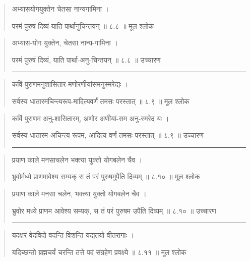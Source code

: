 \begin{quotation} 

अभ्यासयोगयुक्तेन चेतसा नान्यगामिना  ।  

परमं पुरुषं दिव्यं याति पार्थानुचिन्तयन्‌  ॥ ८.८ ॥  मूल श्लोक
\end{quotation}

\begin{quotation}

अभ्यास-योग युक्तेन, चेतसा नान्य-गामिना  ।  

परमं पुरुषं दिव्यं, याति पार्था-अनु-चिन्तयन्‌  ॥ ८.८ ॥  उच्चारण

\noindent\rule{16cm}{0.4pt} 
\end{quotation}


\begin{quotation} 

कविं पुराणमनुशासितार-मणोरणीयांसमनुस्मरेद्यः  ।  

सर्वस्य धातारमचिन्त्यरूप-मादित्यवर्णं तमसः परस्तात्‌  ॥ ८.९ ॥  मूल श्लोक
\end{quotation}

\begin{quotation}

कविं पुराणम अनु-शासितारम्, 
अणोर अणीयां-सम अनु-स्मरेद यः  ।  

सर्वस्य धातारम अचिन्त्य रूपम, 
आदित्य वर्णं तमसः परस्तात्‌  ॥ ८.९ ॥  उच्चारण

\noindent\rule{16cm}{0.4pt} 
\end{quotation}


\begin{quotation} 

प्रयाण काले मनसाचलेन 
भक्त्या युक्तो योगबलेन चैव  ।  

भ्रुवोर्मध्ये प्राणमावेश्य सम्यक्‌ 
स तं परं पुरुषमुपैति दिव्यम्‌  ॥ ८.१० ॥  मूल श्लोक
\end{quotation}

\begin{quotation}


प्रयाण काले मनसा चलेन, 
भक्त्या युक्तो योगबलेन चैव  ।  

भ्रुवोर मध्ये प्राणम आवेश्य सम्यक्‌, 
स तं परं पुरुषम उपैति दिव्यम्‌  ॥ ८.१० ॥  उच्चारण

\noindent\rule{16cm}{0.4pt} 
\end{quotation}


\begin{quotation} 

यदक्षरं वेदविदो वदन्ति विशन्ति यद्यतयो वीतरागाः  ।  

यदिच्छन्तो ब्रह्मचर्यं चरन्ति तत्ते पदं संग्रहेण प्रवक्ष्ये  ॥ ८.११ ॥  मूल श्लोक
\end{quotation}

